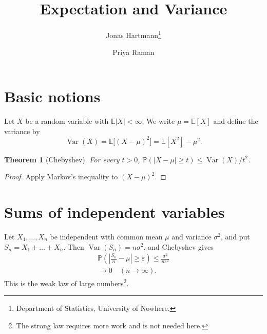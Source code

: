 \documentclass[11pt,a4paper]{article}
\title{Expectation and Variance}
\author{Jonas Hartmann\thanks{Department of Statistics, University of Nowhere.} \and Priya Raman}
\date{}
\newtheorem{theorem}{Theorem}
\begin{document}
\maketitle
\section{Basic notions}
Let $X$ be a random variable with $\mathbb{E}|X|<\infty$. We write $\mu=\mathbb{E}[X]$ and define the variance by
\[
\operatorname{Var}(X)=\mathbb{E}\bigl[(X-\mu)^2\bigr]=\mathbb{E}[X^2]-\mu^2.
\]
\begin{theorem}[Chebyshev]
For every $t>0$, $\mathbb{P}(|X-\mu|\ge t)\le \operatorname{Var}(X)/t^2$.
\end{theorem}
\begin{proof}
Apply Markov's inequality to $(X-\mu)^2$.
\end{proof}

\section{Sums of independent variables}
Let $X_1,\dots,X_n$ be independent with common mean $\mu$ and variance $\sigma^2$, and put $S_n=X_1+\dots+X_n$. Then $\operatorname{Var}(S_n)=n\sigma^2$, and Chebyshev gives
\begin{multline}
\mathbb{P}\!\left(\left|\frac{S_n}{n}-\mu\right|\ge \varepsilon\right)\le \frac{\sigma^2}{n\varepsilon^2}\\
\longrightarrow 0\quad (n\to\infty).
\end{multline}
This is the weak law of large numbers\footnote{The strong law requires more work and is not needed here.}.
\end{document}

